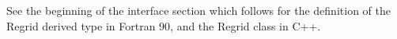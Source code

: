 

See the beginning of the interface section which
follows for the definition of the Regrid derived type
in Fortran 90, and the Regrid class in C++.


